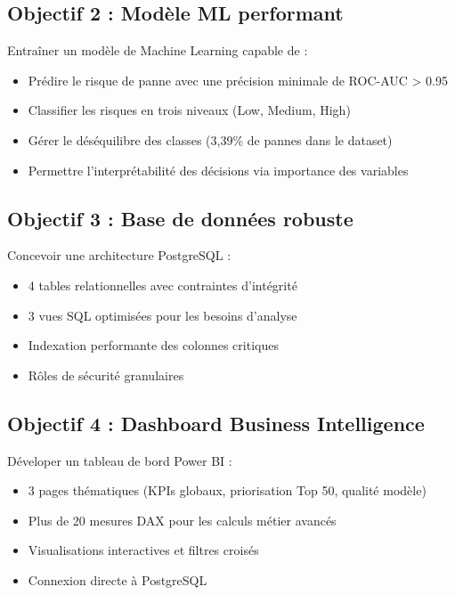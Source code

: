 \documentclass[a4paper,12pt,twoside]{report}
\begin{document}
\subsection{Objectif 2 : Modèle ML performant}

Entraîner un modèle de Machine Learning capable de :
\begin{itemize}
    \item Prédire le risque de panne avec une précision minimale de ROC-AUC > 0.95
    \item Classifier les risques en trois niveaux (Low, Medium, High)
    \item Gérer le déséquilibre des classes (3,39\% de pannes dans le dataset)
    \item Permettre l'interprétabilité des décisions via importance des variables
\end{itemize}

\subsection{Objectif 3 : Base de données robuste}

Concevoir une architecture PostgreSQL :
\begin{itemize}
    \item 4 tables relationnelles avec contraintes d'intégrité
    \item 3 vues SQL optimisées pour les besoins d'analyse
    \item Indexation performante des colonnes critiques
    \item Rôles de sécurité granulaires
\end{itemize}

\subsection{Objectif 4 : Dashboard Business Intelligence}

Déveloper un tableau de bord Power BI :
\begin{itemize}
    \item 3 pages thématiques (KPIs globaux, priorisation Top 50, qualité modèle)
    \item Plus de 20 mesures DAX pour les calculs métier avancés
    \item Visualisations interactives et filtres croisés
    \item Connexion directe à PostgreSQL
\end{itemize}
\end{document}
